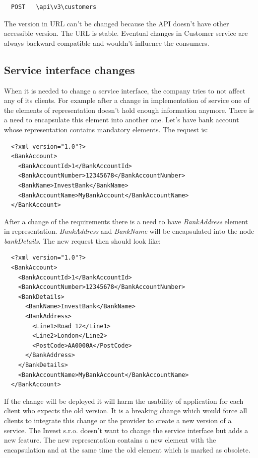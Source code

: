 \begin{lstlisting}
  POST   \api\v3\customers
\end{lstlisting}

The version in URL can't be changed because the API doesn't have other accessible version. The URL is stable. Eventual changes in Customer service are always backward compatible and wouldn't influence the consumers. 

\subsection{Service interface changes}
When it is needed to change a service interface, the company tries to not affect any of its clients. For example after a change in implementation of service one of the elements of representation doesn't hold enough information anymore. There is a need to encapsulate this element into another one. Let's have bank account whose representation contains mandatory elements. The request is:

\begin{lstlisting}
  <?xml version="1.0"?>
  <BankAccount>
    <BankAccountId>1</BankAccountId>
    <BankAccountNumber>12345678</BankAccountNumber>
    <BankName>InvestBank</BankName>
    <BankAccountName>MyBankAccount</BankAccountName>
  </BankAccount>
\end{lstlisting}

After a change of the requirements there is a need to have \emph{BankAddress} element in representation. \emph{BankAddress} and \emph{BankName} will be encapsulated into the node \emph{bankDetails}. The new request then should look like:

\begin{lstlisting}
  <?xml version="1.0"?>
  <BankAccount>
    <BankAccountId>1</BankAccountId>
    <BankAccountNumber>12345678</BankAccountNumber>
    <BankDetails>
      <BankName>InvestBank</BankName>
      <BankAddress>
        <Line1>Road 12</Line1>
        <Line2>London</Line2>
        <PostCode>AA0000A</PostCode>
      </BankAddress>
    </BankDetails>
    <BankAccountName>MyBankAccount</BankAccountName>
  </BankAccount>
\end{lstlisting}

If the change will be deployed it will harm the usability of application for each client who expects the old version. It is a breaking change which would force all clients to integrate this change or the provider to create a new version of a service. The Invest s.r.o. doesn't want to change the service interface but adds a new feature. The new representation contains a new element with the encapsulation and at the same time the old element which is marked as obsolete.

